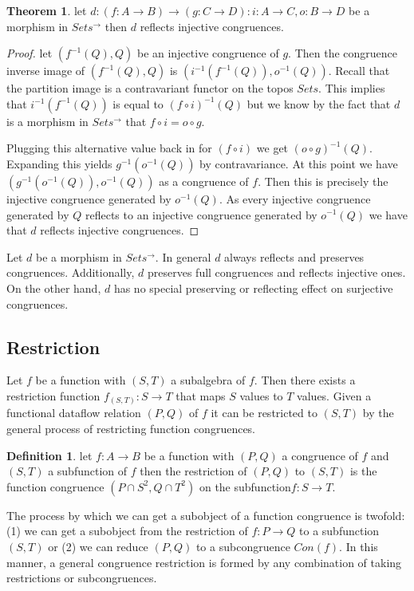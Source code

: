 \documentclass[a4paper,11pt, notitlepage]{report}
\theoremstyle{definition}
\newtheorem{definition}{Definition}[section]
\newtheorem{theorem}{Theorem}[section]
\begin{document}
\newpage

\begin{theorem}
let $d: (f: A \to B) \to (g: C \to D) : i : A \to C, o : B \to D$ be a morphism in $Sets^{\to}$ then $d$ reflects injective congruences.
\end{theorem}

\begin{proof}
let $(f^{-1}(Q),Q)$ be an injective congruence of $g$. Then the congruence inverse image of $(f^{-1}(Q),Q)$ is $(i^{-1}(f^{-1}(Q)),o^{-1}(Q))$. Recall that the partition image is a contravariant functor on the topos $Sets$. This implies that $i^{-1}(f^{-1}(Q))$ is equal to $(f \circ i)^{-1}(Q)$ but we know by the fact that $d$ is a morphism in $Sets^{\to}$ that $f \circ i = o \circ g$.

Plugging this alternative value back in for $(f \circ i)$ we get $(o \circ g)^{-1}(Q)$. Expanding this yields $g^{-1}(o^{-1}(Q))$ by contravariance. At this point we have $(g^{-1}(o^{-1}(Q)), o^{-1}(Q))$ as a congruence of $f$. Then this is precisely the injective congruence generated by $o^{-1}(Q)$. As every injective congruence generated by $Q$ reflects to an injective congruence generated by $o^{-1}(Q)$ we have that $d$ reflects injective congruences.
\end{proof}

Let $d$ be a morphism in $Sets^{\to}$. In general $d$ always reflects and preserves congruences. Additionally, $d$ preserves full congruences and reflects injective ones. On the other hand, $d$ has no special preserving or reflecting effect on surjective congruences.

\subsection{Restriction}
Let $f$ be a function with $(S,T)$ a subalgebra of $f$. Then there exists a restriction function $f_{(S,T)} : S \to T$ that maps $S$ values to $T$ values. Given a functional dataflow relation $(P,Q)$ of $f$ it can be restricted to $(S,T)$ by the general process of restricting function congruences.

\begin{definition}
let $f : A \to  B$ be a function with $(P,Q)$ a congruence of $f$ and $(S,T)$ a subfunction of $f$ then the restriction of $(P,Q)$ to $(S,T)$ is the function congruence $(P \cap S^2, Q \cap T^2)$ on the subfunction$f: S \to T$.
\end{definition}

The process by which we can get a subobject of a function congruence is twofold: (1) we can get a subobject from the restriction of $f: P \to Q$ to a subfunction $(S,T)$ or (2) we can reduce $(P,Q)$ to a subcongruence $Con(f)$. In this manner, a general congruence restriction is formed by any combination of taking restrictions or subcongruences.
\end{document}
